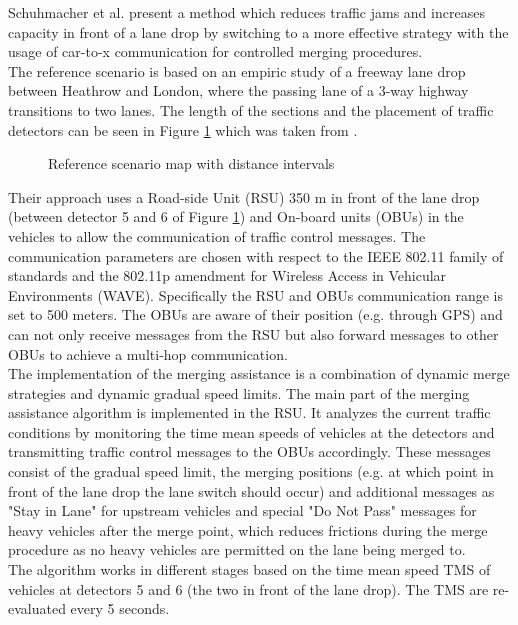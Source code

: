 \documentclass{sig-alternate}
\begin{document}
Schuhmacher et al. present a method which reduces traffic jams and increases capacity in front of a lane drop by switching to a more effective strategy with the usage of car-to-x communication for controlled merging procedures.\\ The reference scenario is based on an empiric study\cite{bertini2005empirical} of a freeway lane drop between Heathrow and London, where the passing lane of a 3-way highway transitions to two lanes. The length of the sections and the placement of traffic detectors can be seen in Figure \ref{fig:schuhmacher1} which was taken from \cite {1614269.1614274}. \\
\begin{figure} [h]
\centering
{}
\caption{Reference scenario map with distance intervals}
\label{fig:schuhmacher1}
\end{figure}
Their approach uses a Road-side Unit (RSU) 350 m in front of the lane drop (between detector 5 and 6 of Figure \ref{fig:schuhmacher1}) and On-board units (OBUs) in the vehicles to allow the communication of traffic control messages. The communication parameters are chosen with respect to the IEEE 802.11 family of standards and the 802.11p amendment for Wireless Access in Vehicular Environments (WAVE). Specifically the RSU and OBUs communication range is set to 500 meters. The OBUs are aware of their position (e.g. through GPS) and can not only receive messages from the RSU but also forward messages to other OBUs to achieve a multi-hop communication. \\
The implementation of the merging assistance is a combination of dynamic merge strategies and dynamic gradual speed limits. The main part of the merging assistance algorithm is implemented in the RSU. It analyzes the current traffic conditions by monitoring the time mean speeds of vehicles at the detectors and transmitting traffic control messages  to the OBUs accordingly. These messages consist of the gradual speed limit, the merging positions (e.g. at which point in front of the lane drop the lane switch should occur) and additional messages as "Stay in Lane"  for upstream vehicles and special  "Do Not Pass" messages for heavy vehicles after the merge point, which reduces frictions during the merge procedure as no heavy vehicles are permitted on the lane being merged to. \\
The algorithm works in different stages based on the time mean speed TMS of vehicles at detectors 5 and 6 (the two in front of the lane drop). The TMS are re-evaluated every 5 seconds.
\end{document}
